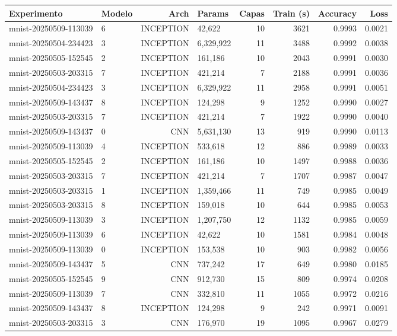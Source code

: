 \begin{tabular}{llrlrrrr}
\toprule
Experimento & Modelo & Arch & Params & Capas & Train (s) & Accuracy & Loss \\
\midrule
mnist-20250509-113039 & 6 & INCEPTION & 42,622 & 10 & 3621 & 0.9993 & 0.0021 \\
mnist-20250504-234423 & 3 & INCEPTION & 6,329,922 & 11 & 3488 & 0.9992 & 0.0038 \\
mnist-20250505-152545 & 2 & INCEPTION & 161,186 & 10 & 2043 & 0.9991 & 0.0030 \\
mnist-20250503-203315 & 7 & INCEPTION & 421,214 & 7 & 2188 & 0.9991 & 0.0036 \\
mnist-20250504-234423 & 3 & INCEPTION & 6,329,922 & 11 & 2958 & 0.9991 & 0.0051 \\
mnist-20250509-143437 & 8 & INCEPTION & 124,298 & 9 & 1252 & 0.9990 & 0.0027 \\
mnist-20250503-203315 & 7 & INCEPTION & 421,214 & 7 & 1922 & 0.9990 & 0.0040 \\
mnist-20250509-143437 & 0 & CNN & 5,631,130 & 13 & 919 & 0.9990 & 0.0113 \\
mnist-20250509-113039 & 4 & INCEPTION & 533,618 & 12 & 886 & 0.9989 & 0.0033 \\
mnist-20250505-152545 & 2 & INCEPTION & 161,186 & 10 & 1497 & 0.9988 & 0.0036 \\
mnist-20250503-203315 & 7 & INCEPTION & 421,214 & 7 & 1707 & 0.9987 & 0.0047 \\
mnist-20250503-203315 & 1 & INCEPTION & 1,359,466 & 11 & 749 & 0.9985 & 0.0049 \\
mnist-20250503-203315 & 8 & INCEPTION & 159,018 & 10 & 644 & 0.9985 & 0.0053 \\
mnist-20250509-113039 & 3 & INCEPTION & 1,207,750 & 12 & 1132 & 0.9985 & 0.0059 \\
mnist-20250509-113039 & 6 & INCEPTION & 42,622 & 10 & 1581 & 0.9984 & 0.0048 \\
mnist-20250509-113039 & 0 & INCEPTION & 153,538 & 10 & 903 & 0.9982 & 0.0056 \\
mnist-20250509-143437 & 5 & CNN & 737,242 & 17 & 649 & 0.9980 & 0.0185 \\
mnist-20250505-152545 & 9 & CNN & 912,730 & 15 & 809 & 0.9974 & 0.0208 \\
mnist-20250509-113039 & 7 & CNN & 332,810 & 11 & 1055 & 0.9972 & 0.0216 \\
mnist-20250509-143437 & 8 & INCEPTION & 124,298 & 9 & 242 & 0.9971 & 0.0091 \\
mnist-20250503-203315 & 3 & CNN & 176,970 & 19 & 1095 & 0.9967 & 0.0279 \\

\end{tabular}
